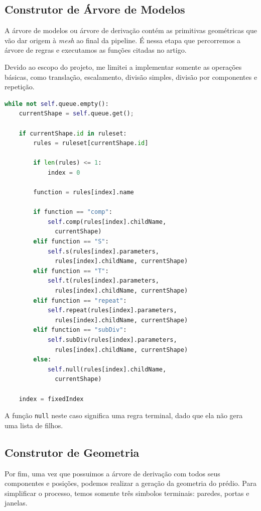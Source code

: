 \documentclass[a4paper, 11pt]{article}
\begin{document}
        \subsection{Construtor de Árvore de Modelos}
        A árvore de modelos ou árvore de derivação contém as primitivas geométricas que vão dar origem à \textit{mesh} ao final da pipeline. É nessa etapa que percorremos a árvore de regras e executamos as funções citadas no artigo.

        Devido ao escopo do projeto, me limitei a implementar somente as operações básicas, como translação, escalamento, divisão simples, divisão por componentes e repetição. 

        \begin{center}
        \begin{lstlisting}[language=python,caption=Laço principal do contrutor da árvore de derivação., frame=single, basicstyle=\ttfamily\small, captionpos=b]
while not self.queue.empty():
    currentShape = self.queue.get();

    if currentShape.id in ruleset:
        rules = ruleset[currentShape.id]

        if len(rules) <= 1:
            index = 0

        function = rules[index].name

        if function == "comp":
            self.comp(rules[index].childName, 
              currentShape)
        elif function == "S":
            self.s(rules[index].parameters, 
              rules[index].childName, currentShape)
        elif function == "T":
            self.t(rules[index].parameters, 
              rules[index].childName, currentShape)
        elif function == "repeat":
            self.repeat(rules[index].parameters, 
              rules[index].childName, currentShape)
        elif function == "subDiv":
            self.subDiv(rules[index].parameters, 
              rules[index].childName, currentShape)
        else:
            self.null(rules[index].childName, 
              currentShape)

    index = fixedIndex
        \end{lstlisting}
        \label{lst:derivation}
    \end{center}

    A função \texttt{null} neste caso significa uma regra terminal, dado que ela não gera uma lista de filhos.

        \subsection{Construtor de Geometria}
        Por fim, uma vez que possuimos a árvore de derivação com todos seus componentes e posições, podemos realizar a geração da geometria do prédio. Para simplificar o processo, temos somente três simbolos terminais: paredes, portas e janelas. 
\end{document}
